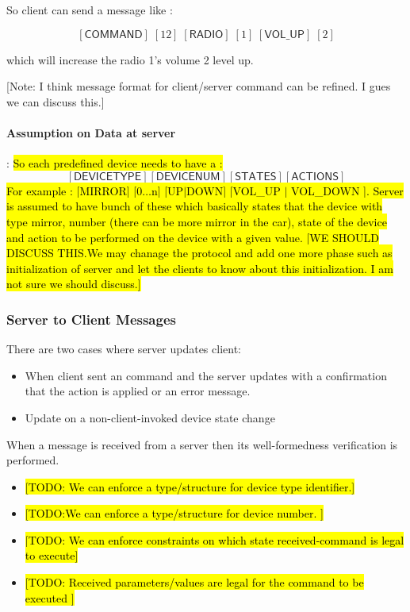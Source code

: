 So client can send a message like :

\[ [\textsf{COMMAND}]\;[12]\;[\textsf{RADIO}]\;[1]\;[\textsf{VOL\_UP}]\;[2]\]

which will increase the radio 1's volume 2 level up.

[Note: I think message format for client/server command can be refined. I gues we can discuss this.]

\paragraph{Assumption on Data at server}:  \hl{So each predefined device needs to have a :}
\[  [\textsf{DEVICETYPE}] [\textsf{DEVICENUM}] [\textsf{STATES}] [\textsf{ACTIONS}]\]
\hl{
For example : [MIRROR] [0$\ldots$n] [UP$\mid$DOWN] [VOL\_UP $\mid$ VOL\_DOWN ]. Server is assumed to have bunch of these which basically states that the device with type mirror, number (there can be more mirror in the car), state of the device and action to be performed on the device with a given value. [WE SHOULD DISCUSS THIS.We may chanage the protocol and add one more phase such as  initialization of server and let the clients to know about this initialization. I am not sure we should discuss.]}

\subsubsection{Server to Client Messages}
\label{sec:pdus:pdu:s_to_c}
There are two cases where server updates client:
\begin{itemize}
\item When client sent an command and the server updates with a confirmation that the action is applied or an error message.
  \item Update on a non-client-invoked device state change
  \end{itemize}

When a message is received from a server then its well-formedness verification is performed.
\begin{itemize}
\item \hl{[TODO: We can enforce a type/structure for device type identifier.]}
\item \hl{[TODO:We can enforce a type/structure for device number. ]}
\item \hl{[TODO: We can enforce constraints on which state received-command is legal to execute]}
  \item \hl{[TODO: Received parameters/values are legal for the command to be executed ]}
\end{itemize}

